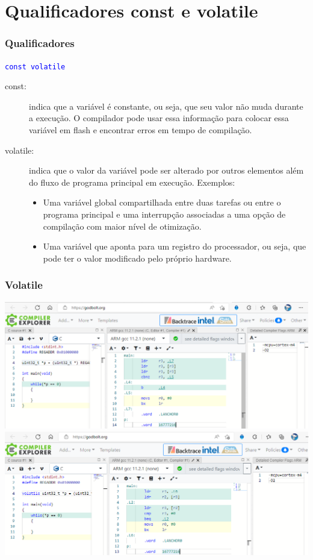 \documentclass{beamer}
\begin{document}
\section{Qualificadores const e volatile}

\begin{frame}
	\frametitle{Qualificadores}
	\begin{center}
		\texttt{\textcolor{blue}{const volatile}}
	\end{center}
		\vspace*{0.5cm}
	\begin{description}
	\item [const:] indica que a variável é constante, ou seja, que seu valor não muda durante a execução. O compilador pode usar essa informação para colocar essa variável em flash e encontrar erros em tempo de compilação.
	\item [volatile:] indica que o valor da variável pode ser alterado por outros elementos além do fluxo de programa principal em execução. Exemplos:
    {\footnotesize
    \begin{itemize}
    \item Uma variável global compartilhada entre duas tarefas ou entre o programa principal e uma interrupção associadas a uma opção de compilação com maior nível de otimização.
    \item Uma variável que aponta para um registro do processador, ou seja, que pode ter o valor modificado pelo próprio hardware.
    \end{itemize}
    }
	\end{description}
\end{frame}

\begin{frame}
	\frametitle{Volatile}
	\begin{center}
		\includegraphics[scale=0.35]{imgs/vol1.png} \\
		\includegraphics[scale=0.35]{imgs/vol2.png}
	\end{center}
\end{frame}
\end{document}
